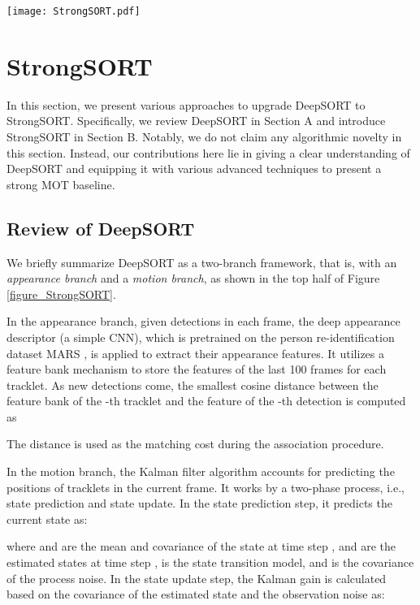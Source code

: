 \documentclass[lettersize,journal]{IEEEtran}
\begin{document}
\begin{figure*}[t]
  \centering
  \texttt{[image: StrongSORT.pdf]}
  \caption{
    Framework and performance comparison between DeepSORT and StrongSORT.
    Performance is evaluated on the MOT17 validation set based on detections predicted by YOLOX \cite{ge2021yolox}.
  }
  \label{figure_StrongSORT}
\end{figure*}

\section{StrongSORT}

In this section, we present various approaches to upgrade DeepSORT \cite{wojke2017simple} to StrongSORT.
Specifically, we review DeepSORT in Section A and introduce StrongSORT in Section B. 
Notably, we do not claim any algorithmic novelty in this section.
Instead, our contributions here lie in giving a clear understanding of DeepSORT 
and equipping it with various advanced techniques to present a strong MOT baseline.

\subsection{Review of DeepSORT}

We briefly summarize DeepSORT as a two-branch framework, that is, with an \emph{appearance branch} and a \emph{motion branch},
as shown in the top half of Figure \ref{figure_StrongSORT}.

In the appearance branch, given detections in each frame, the deep appearance descriptor (a simple CNN), 
which is pretrained on the person re-identification dataset MARS \cite{zheng2016mars}, is applied to extract their appearance features.
It utilizes a feature bank mechanism to store the features of the last 100 frames for each tracklet.
As new detections come, the smallest cosine distance between the feature bank  of the -th tracklet and the feature  of the -th detection is computed as

The distance is used as the matching cost during the association procedure.

In the motion branch, the Kalman filter algorithm \cite{1960A} accounts for predicting the positions of tracklets in the current frame.
It works by a two-phase process, i.e., state prediction and state update.
In the state prediction step, it predicts the current state as:


where  and  are the mean and covariance of the state at time step , 
 and  are the estimated states at time step ,  is the state transition model,
and  is the covariance of the process noise.
In the state update step, the Kalman gain is calculated based on the covariance of the estimated state 
and the observation noise  as:
\end{document}
